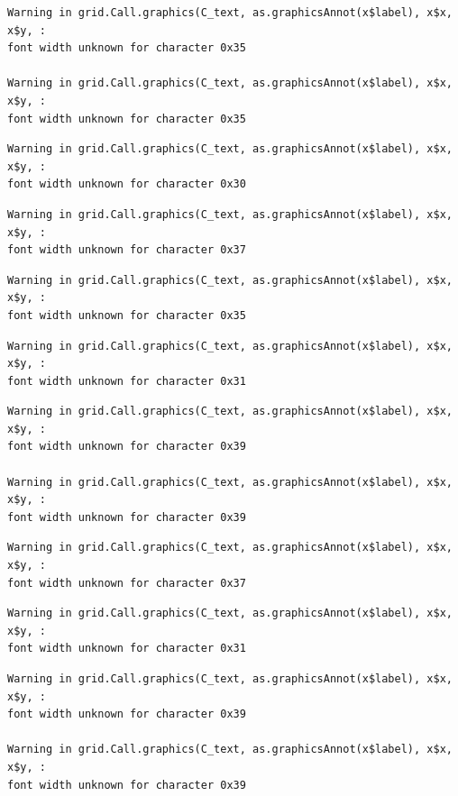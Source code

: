\documentclass[
  letterpaper,
  DIV=11,
  numbers=noendperiod]{scrreprt}
\begin{document}
\begin{verbatim}
Warning in grid.Call.graphics(C_text, as.graphicsAnnot(x$label), x$x, x$y, :
font width unknown for character 0x35

Warning in grid.Call.graphics(C_text, as.graphicsAnnot(x$label), x$x, x$y, :
font width unknown for character 0x35
\end{verbatim}

\begin{verbatim}
Warning in grid.Call.graphics(C_text, as.graphicsAnnot(x$label), x$x, x$y, :
font width unknown for character 0x30
\end{verbatim}

\begin{verbatim}
Warning in grid.Call.graphics(C_text, as.graphicsAnnot(x$label), x$x, x$y, :
font width unknown for character 0x37
\end{verbatim}

\begin{verbatim}
Warning in grid.Call.graphics(C_text, as.graphicsAnnot(x$label), x$x, x$y, :
font width unknown for character 0x35
\end{verbatim}

\begin{verbatim}
Warning in grid.Call.graphics(C_text, as.graphicsAnnot(x$label), x$x, x$y, :
font width unknown for character 0x31
\end{verbatim}

\begin{verbatim}
Warning in grid.Call.graphics(C_text, as.graphicsAnnot(x$label), x$x, x$y, :
font width unknown for character 0x39

Warning in grid.Call.graphics(C_text, as.graphicsAnnot(x$label), x$x, x$y, :
font width unknown for character 0x39
\end{verbatim}

\begin{verbatim}
Warning in grid.Call.graphics(C_text, as.graphicsAnnot(x$label), x$x, x$y, :
font width unknown for character 0x37
\end{verbatim}

\begin{verbatim}
Warning in grid.Call.graphics(C_text, as.graphicsAnnot(x$label), x$x, x$y, :
font width unknown for character 0x31
\end{verbatim}

\begin{verbatim}
Warning in grid.Call.graphics(C_text, as.graphicsAnnot(x$label), x$x, x$y, :
font width unknown for character 0x39

Warning in grid.Call.graphics(C_text, as.graphicsAnnot(x$label), x$x, x$y, :
font width unknown for character 0x39
\end{verbatim}
\end{document}
